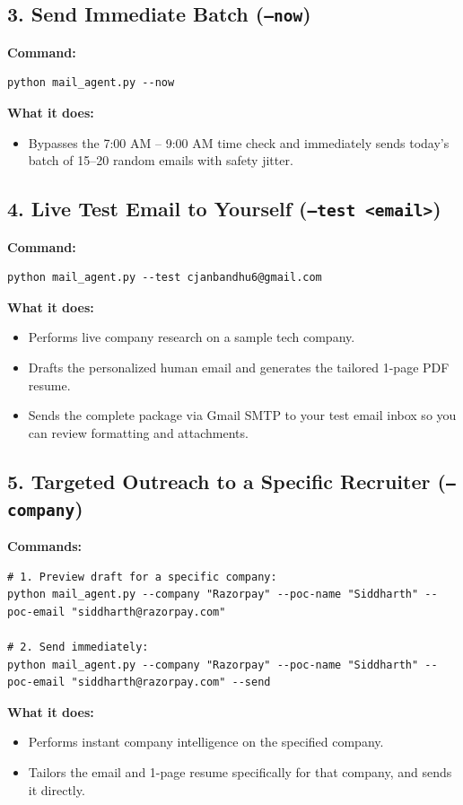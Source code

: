 \documentclass[11pt,a4paper]{article}
\begin{document}
\subsection{3. Send Immediate Batch (\texttt{--now})}
\textbf{Command:}
\begin{verbatim}
python mail_agent.py --now
\end{verbatim}
\textbf{What it does:}
\begin{itemize}[leftmargin=14pt, itemsep=1pt]
    \item Bypasses the 7:00 AM – 9:00 AM time check and immediately sends today's batch of 15--20 random emails with safety jitter.
\end{itemize}

\newpage

\subsection{4. Live Test Email to Yourself (\texttt{--test <email>})}
\textbf{Command:}
\begin{verbatim}
python mail_agent.py --test cjanbandhu6@gmail.com
\end{verbatim}
\textbf{What it does:}
\begin{itemize}[leftmargin=14pt, itemsep=1pt]
    \item Performs live company research on a sample tech company.
    \item Drafts the personalized human email and generates the tailored 1-page PDF resume.
    \item Sends the complete package via Gmail SMTP to your test email inbox so you can review formatting and attachments.
\end{itemize}

\subsection{5. Targeted Outreach to a Specific Recruiter (\texttt{--company})}
\textbf{Commands:}
\begin{verbatim}
# 1. Preview draft for a specific company:
python mail_agent.py --company "Razorpay" --poc-name "Siddharth" --poc-email "siddharth@razorpay.com"

# 2. Send immediately:
python mail_agent.py --company "Razorpay" --poc-name "Siddharth" --poc-email "siddharth@razorpay.com" --send
\end{verbatim}
\textbf{What it does:}
\begin{itemize}[leftmargin=14pt, itemsep=1pt]
    \item Performs instant company intelligence on the specified company.
    \item Tailors the email and 1-page resume specifically for that company, and sends it directly.
\end{itemize}
\end{document}
